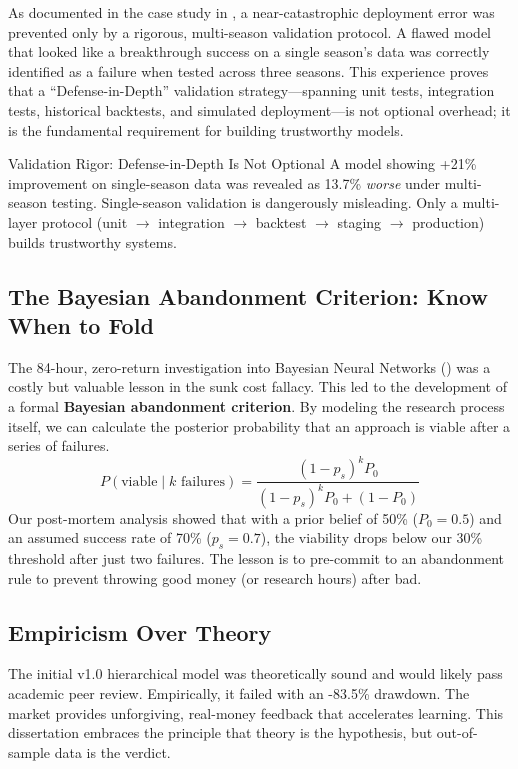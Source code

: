 As documented in the case study in , a near-catastrophic deployment error was prevented only by a rigorous, multi-season validation protocol. A flawed model that looked like a breakthrough success on a single season's data was correctly identified as a failure when tested across three seasons. This experience proves that a ``Defense-in-Depth'' validation strategy---spanning unit tests, integration tests, historical backtests, and simulated deployment---is not optional overhead; it is the fundamental requirement for building trustworthy models.

\begin{keyfinding}{Validation Rigor: Defense-in-Depth Is Not Optional}
A model showing +21\% improvement on single-season data was revealed as 13.7\% \emph{worse} under multi-season testing. Single-season validation is dangerously misleading. Only a multi-layer protocol (unit $\to$ integration $\to$ backtest $\to$ staging $\to$ production) builds trustworthy systems.
\end{keyfinding}

\subsection{The Bayesian Abandonment Criterion: Know When to Fold}

The 84-hour, zero-return investigation into Bayesian Neural Networks () was a costly but valuable lesson in the sunk cost fallacy. This led to the development of a formal \textbf{Bayesian abandonment criterion}. By modeling the research process itself, we can calculate the posterior probability that an approach is viable after a series of failures.
\begin{equation}
P(\text{viable} \mid k \text{ failures}) = \frac{(1 - p_s)^k P_0}{(1 - p_s)^k P_0 + (1 - P_0)}
\end{equation}
Our post-mortem analysis showed that with a prior belief of 50\% ($P_0=0.5$) and an assumed success rate of 70\% ($p_s=0.7$), the viability drops below our 30\% threshold after just two failures. The lesson is to pre-commit to an abandonment rule to prevent throwing good money (or research hours) after bad.

\subsection{Empiricism Over Theory}
The initial v1.0 hierarchical model was theoretically sound and would likely pass academic peer review. Empirically, it failed with an -83.5\% drawdown. The market provides unforgiving, real-money feedback that accelerates learning. This dissertation embraces the principle that theory is the hypothesis, but out-of-sample data is the verdict.

